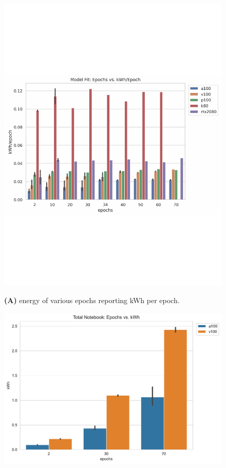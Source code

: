 \documentclass[utf8]{FrontiersinVancouver} %
\begin{document}
\begin{figure}[htb]

  \begin{center}

       \includegraphics[height=0.3\textheight]{images/energy_all_model_fit_kWh_per_epoch.pdf}

       {\bf (A)} energy of various epochs reporting kWh per epoch.
          
        \includegraphics[height=0.3\textheight]{images/total_epoch_vs_watts.pdf}


\end{center}
\end{figure}
\end{document}
